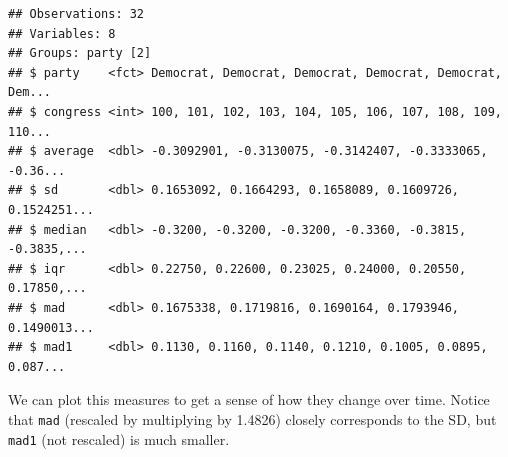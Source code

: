 \documentclass[]{book}
\newenvironment{Shaded}{\begin{snugshade}}{\end{snugshade}}
\newcommand{\CommentTok}[1]{\textcolor[rgb]{0.56,0.35,0.01}{\textit{#1}}}
\newcommand{\DataTypeTok}[1]{\textcolor[rgb]{0.13,0.29,0.53}{#1}}
\newcommand{\DecValTok}[1]{\textcolor[rgb]{0.00,0.00,0.81}{#1}}
\newcommand{\KeywordTok}[1]{\textcolor[rgb]{0.13,0.29,0.53}{\textbf{#1}}}
\newcommand{\NormalTok}[1]{#1}
\newcommand{\OperatorTok}[1]{\textcolor[rgb]{0.81,0.36,0.00}{\textbf{#1}}}
\newcommand{\OtherTok}[1]{\textcolor[rgb]{0.56,0.35,0.01}{#1}}
\newcommand{\StringTok}[1]{\textcolor[rgb]{0.31,0.60,0.02}{#1}}
\begin{document}
\begin{Shaded}
\end{Shaded}

\begin{verbatim}
## Observations: 32
## Variables: 8
## Groups: party [2]
## $ party    <fct> Democrat, Democrat, Democrat, Democrat, Democrat, Dem...
## $ congress <int> 100, 101, 102, 103, 104, 105, 106, 107, 108, 109, 110...
## $ average  <dbl> -0.3092901, -0.3130075, -0.3142407, -0.3333065, -0.36...
## $ sd       <dbl> 0.1653092, 0.1664293, 0.1658089, 0.1609726, 0.1524251...
## $ median   <dbl> -0.3200, -0.3200, -0.3200, -0.3360, -0.3815, -0.3835,...
## $ iqr      <dbl> 0.22750, 0.22600, 0.23025, 0.24000, 0.20550, 0.17850,...
## $ mad      <dbl> 0.1675338, 0.1719816, 0.1690164, 0.1793946, 0.1490013...
## $ mad1     <dbl> 0.1130, 0.1160, 0.1140, 0.1210, 0.1005, 0.0895, 0.087...
\end{verbatim}

We can plot this measures to get a sense of how they change over time. Notice that \texttt{mad} (rescaled by multiplying by 1.4826) closely corresponds to the SD, but \texttt{mad1} (not rescaled) is much smaller.
\end{document}
